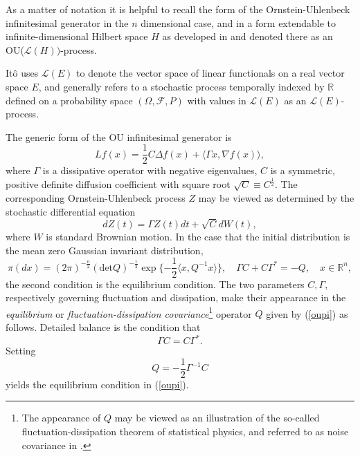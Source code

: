 \documentclass[11pt]{article}
\numberwithin{equation}{section}
\theoremstyle{definition}
\theoremstyle{remark}
\theoremstyle{definition}
\begin{document}
As a matter of notation it is helpful to recall the form of
the  Ornstein-Uhlenbeck infinitesimal generator in the $n$ dimensional case,
and in a form extendable to  infinite-dimensional Hilbert space $H$
as developed in \cite{ito} and denoted there as an OU($\mathcal{L}(H))$-process. 
 \begin{remark} It\^o uses
 $\mathcal{L}(E)$ to denote the
vector space of linear functionals on a real vector
space $E$, and generally refers to a stochastic process
temporally indexed by $\mathbb{R}$ defined on a probability space
$(\Omega,\mathcal{F},P)$ with values in $\mathcal{L}(E)$ as
 an $\mathcal{L}(E)$-process.
 \end{remark}
 The generic form of the OU infinitesimal generator is 
$$Lf(x) = \frac{1}{2}C\Delta f(x) + \langle\Gamma x,\nabla f(x)\rangle,$$
where  $\Gamma $ is a dissipative operator with negative eigenvalues, $C$ is
a symmetric, positive definite diffusion coefficient with 
square root $\sqrt{C}\equiv C^{\frac{1}{2}}$. The corresponding Ornstein-Uhlenbeck process $Z$ may be 
viewed as determined by the stochastic differential 
equation
\begin{equation}\label{ousde}
dZ(t) = \Gamma Z(t)dt + \sqrt{C}dW(t),
\end{equation}
where $W$ is standard Brownian motion.
In the case that the initial distribution is the mean
zero Gaussian invariant distribution,  
\begin{equation}\label{oupi}
\pi(dx) = (2\pi)^{-\frac{n}{2}}(\text{det}Q)^{-\frac{1}{2}}
\exp\{-\frac{1}{2}\langle x,Q^{-1}x\rangle\}, \quad \Gamma C+ C\Gamma^*
= -Q,
\quad x\in{\mathbb R}^n,
\end{equation}
the second condition is the equilibrium condition. 
The two parameters $C,\Gamma$, respectively 
governing fluctuation and dissipation, 
  make their appearance
 in the {\it equilibrium} or {\it fluctuation-dissipation covariance}\footnote{The appearance of 
 $Q$ may be viewed as an illustration of the
 so-called fluctuation-dissipation theorem of statistical
 physics, and referred to as noise covariance in \cite{Farisito}.}
operator $Q$ given by (\ref{oupi}) as follows.  Detailed balance
is the condition that  
\begin{equation}
\Gamma C = C\Gamma^*.
\end{equation}
Setting 
\begin{equation}Q= -\frac{1}{2}\Gamma^{-1}C
\end{equation}
yields the equilibrium condition in (\ref{oupi}).
\end{document}
